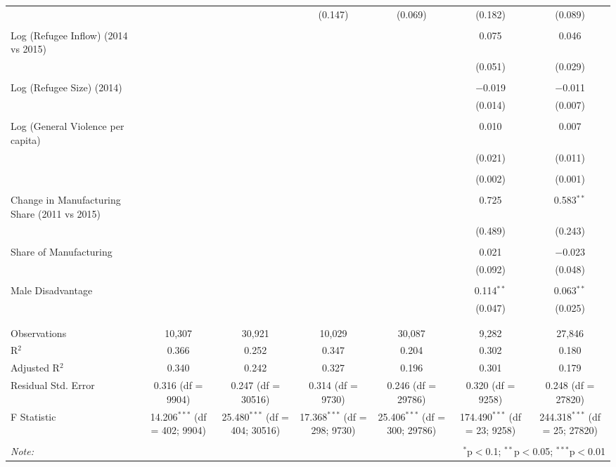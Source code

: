 \begin{table}[!htbp]
\begin{tabular}{@{\extracolsep{5pt}}lcccccc}
  &  &  & (0.147) & (0.069) & (0.182) & (0.089) \\ 
  & & & & & & \\ 
 Log (Refugee Inflow) (2014 vs 2015) &  &  &  &  & 0.075 & 0.046 \\ 
  &  &  &  &  & (0.051) & (0.029) \\ 
  & & & & & & \\ 
 Log (Refugee Size) (2014) &  &  &  &  & $-$0.019 & $-$0.011 \\ 
  &  &  &  &  & (0.014) & (0.007) \\ 
  & & & & & & \\ 
 Log (General Violence per capita) &  &  &  &  & 0.010 & 0.007 \\ 
  &  &  &  &  & (0.021) & (0.011) \\ 
  & & & & & & \\ 
  &  &  &  &  & (0.002) & (0.001) \\ 
  & & & & & & \\ 
 Change in Manufacturing Share (2011 vs 2015) &  &  &  &  & 0.725 & 0.583$^{**}$ \\ 
  &  &  &  &  & (0.489) & (0.243) \\ 
  & & & & & & \\ 
 Share of Manufacturing &  &  &  &  & 0.021 & $-$0.023 \\ 
  &  &  &  &  & (0.092) & (0.048) \\ 
  & & & & & & \\ 
 Male Disadvantage &  &  &  &  & 0.114$^{**}$ & 0.063$^{**}$ \\ 
  &  &  &  &  & (0.047) & (0.025) \\ 
  & & & & & & \\ 
\hline \\[-1.8ex] 
Observations & 10,307 & 30,921 & 10,029 & 30,087 & 9,282 & 27,846 \\ 
R$^{2}$ & 0.366 & 0.252 & 0.347 & 0.204 & 0.302 & 0.180 \\ 
Adjusted R$^{2}$ & 0.340 & 0.242 & 0.327 & 0.196 & 0.301 & 0.179 \\ 
Residual Std. Error & 0.316 (df = 9904) & 0.247 (df = 30516) & 0.314 (df = 9730) & 0.246 (df = 29786) & 0.320 (df = 9258) & 0.248 (df = 27820) \\ 
F Statistic & 14.206$^{***}$ (df = 402; 9904) & 25.480$^{***}$ (df = 404; 30516) & 17.368$^{***}$ (df = 298; 9730) & 25.406$^{***}$ (df = 300; 29786) & 174.490$^{***}$ (df = 23; 9258) & 244.318$^{***}$ (df = 25; 27820) \\ 
\hline 
\hline \\[-1.8ex] 
\textit{Note:}  & \multicolumn{6}{r}{$^{*}$p$<$0.1; $^{**}$p$<$0.05; $^{***}$p$<$0.01} \\ 
\end{tabular} 
\end{table} 
